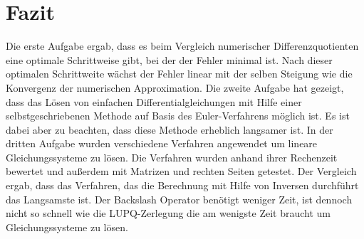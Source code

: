 \chapter{Fazit}\label{sec:fazit}
Die erste Aufgabe ergab, dass es beim Vergleich numerischer Differenzquotienten eine optimale Schrittweise gibt, bei der der Fehler minimal ist. Nach dieser optimalen Schrittweite wächst der Fehler linear mit der selben Steigung wie die Konvergenz der numerischen Approximation.
Die zweite Aufgabe hat gezeigt, dass das Lösen von einfachen Differentialgleichungen mit Hilfe einer selbstgeschriebenen Methode auf Basis des Euler-Verfahrens möglich ist. Es ist dabei aber zu beachten, dass diese Methode erheblich langsamer ist. In der dritten Aufgabe wurden verschiedene Verfahren angewendet um lineare Gleichungssysteme zu lösen. Die Verfahren wurden anhand ihrer Rechenzeit bewertet und außerdem mit Matrizen und rechten Seiten getestet. Der Vergleich ergab, dass das Verfahren, das die Berechnung mit Hilfe von Inversen durchführt das Langsamste ist. Der Backslash Operator benötigt weniger Zeit, ist dennoch nicht so schnell wie die LUPQ-Zerlegung die am wenigste Zeit braucht um Gleichungssysteme zu lösen.
